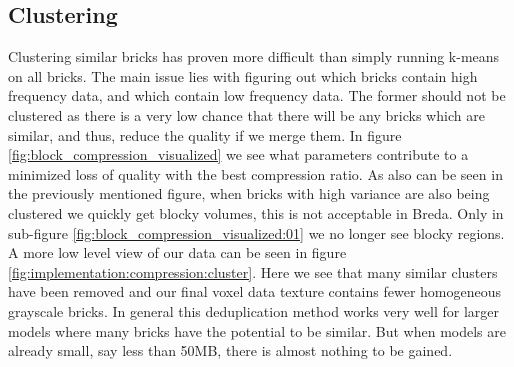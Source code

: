 \subsection{Clustering} \label{results:clustering}
Clustering similar bricks has proven more difficult than simply running k-means on all bricks. The main issue lies with figuring out which bricks contain high frequency data, and which contain low frequency data. The former should not be clustered as there is a very low chance that there will be any bricks which are similar, and thus, reduce the quality if we merge them. In figure \ref{fig:block_compression_visualized} we see what parameters contribute to a minimized loss of quality with the best compression ratio. As also can be seen in the previously mentioned figure, when bricks with high variance are also being clustered we quickly get blocky volumes, this is not acceptable in Breda. Only in sub-figure \ref{fig:block_compression_visualized:01} we no longer see blocky regions. A more low level view of our data can be seen in figure \ref{fig:implementation:compression:cluster}. Here we see that many similar clusters have been removed and our final voxel data texture contains fewer homogeneous grayscale bricks.  In general this deduplication method works very well for larger models where many bricks have the potential to be similar. But when models are already small, say less than 50MB, there is almost nothing to be gained. 


